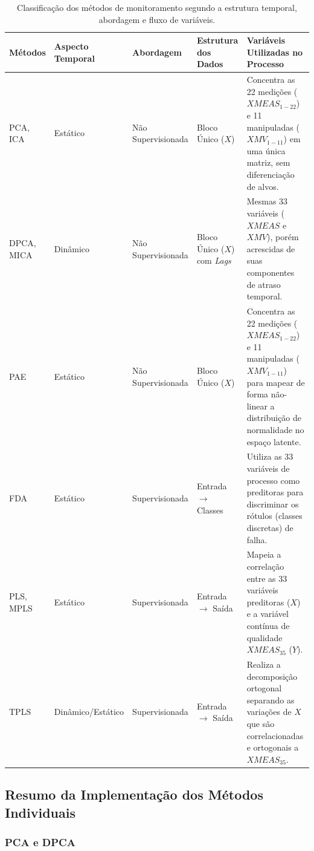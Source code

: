 \documentclass[journal]{IEEEtran}
\begin{document}
\begin{table}[!ht]
\centering
\caption{Classificação dos métodos de monitoramento segundo a estrutura temporal, abordagem e fluxo de variáveis.}
\label{tab:metodos_variaveis_detalhado}
\small
\begin{tabular}{llllp{6.0cm}}
\toprule
\rowcolor{gray!20}
\textbf{Métodos} & \textbf{Aspecto Temporal} & \textbf{Abordagem} & \textbf{Estrutura dos Dados} & \textbf{Variáveis Utilizadas no Processo} \\
\midrule
PCA, ICA & Estático & Não Supervisionada & Bloco Único ($X$) & Concentra as 22 medições ($XMEAS_{1-22}$) e 11 manipuladas ($XMV_{1-11}$) em uma única matriz, sem diferenciação de alvos. \\
\midrule
DPCA, MICA & Dinâmico & Não Supervisionada & Bloco Único ($X$) com \textit{Lags} & Mesmas 33 variáveis ($XMEAS$ e $XMV$), porém acrescidas de suas componentes de atraso temporal. \\
\midrule
PAE & Estático & Não Supervisionada & Bloco Único ($X$) & Concentra as 22 medições ($XMEAS_{1-22}$) e 11 manipuladas ($XMV_{1-11}$) para mapear de forma não-linear a distribuição de normalidade no espaço latente. \\
\midrule
FDA & Estático & Supervisionada & Entrada $\rightarrow$ Classes & Utiliza as 33 variáveis de processo como preditoras para discriminar os rótulos (classes discretas) de falha. \\
\midrule
PLS, MPLS & Estático & Supervisionada & Entrada $\rightarrow$ Saída  & Mapeia a correlação entre as 33 variáveis preditoras ($X$) e a variável contínua de qualidade $XMEAS_{35}$ ($Y$). \\
\midrule
TPLS & Dinâmico/Estático & Supervisionada & Entrada $\rightarrow$ Saída& Realiza a decomposição ortogonal separando as variações de $X$ que são correlacionadas e ortogonais a $XMEAS_{35}$. \\
\bottomrule
\end{tabular}
\end{table}


\subsection{Resumo da Implementação dos Métodos Individuais}
\label{subsec:implementation_summary}

\subsubsection{PCA e DPCA}
\end{document}
